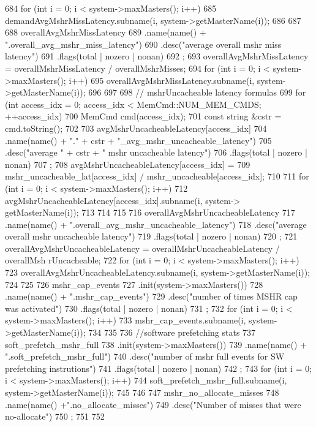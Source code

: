 \begin{DoxyCode}
{684     for (int i = 0; i < system->maxMasters(); i++) {
685         demandAvgMshrMissLatency.subname(i, system->getMasterName(i));
686     }
687 
688     overallAvgMshrMissLatency
689         .name(name() + ".overall_avg_mshr_miss_latency")
690         .desc("average overall mshr miss latency")
691         .flags(total | nozero | nonan)
692         ;
693     overallAvgMshrMissLatency = overallMshrMissLatency / overallMshrMisses;
694     for (int i = 0; i < system->maxMasters(); i++) {
695         overallAvgMshrMissLatency.subname(i, system->getMasterName(i));
696     }
697 
698     // mshrUncacheable latency formulas
699     for (int access_idx = 0; access_idx < MemCmd::NUM_MEM_CMDS; ++access_idx) {
700         MemCmd cmd(access_idx);
701         const string &cstr = cmd.toString();
702 
703         avgMshrUncacheableLatency[access_idx]
704             .name(name() + "." + cstr + "_avg_mshr_uncacheable_latency")
705             .desc("average " + cstr + " mshr uncacheable latency")
706             .flags(total | nozero | nonan)
707             ;
708         avgMshrUncacheableLatency[access_idx] =
709             mshr_uncacheable_lat[access_idx] / mshr_uncacheable[access_idx];
710 
711         for (int i = 0; i < system->maxMasters(); i++) {
712             avgMshrUncacheableLatency[access_idx].subname(i, system->
      getMasterName(i));
713         }
714     }
715 
716     overallAvgMshrUncacheableLatency
717         .name(name() + ".overall_avg_mshr_uncacheable_latency")
718         .desc("average overall mshr uncacheable latency")
719         .flags(total | nozero | nonan)
720         ;
721     overallAvgMshrUncacheableLatency = overallMshrUncacheableLatency / overallMsh
      rUncacheable;
722     for (int i = 0; i < system->maxMasters(); i++) {
723         overallAvgMshrUncacheableLatency.subname(i, system->getMasterName(i));
724     }
725 
726     mshr_cap_events
727         .init(system->maxMasters())
728         .name(name() + ".mshr_cap_events")
729         .desc("number of times MSHR cap was activated")
730         .flags(total | nozero | nonan)
731         ;
732     for (int i = 0; i < system->maxMasters(); i++) {
733         mshr_cap_events.subname(i, system->getMasterName(i));
734     }
735 
736     //software prefetching stats
737     soft_prefetch_mshr_full
738         .init(system->maxMasters())
739         .name(name() + ".soft_prefetch_mshr_full")
740         .desc("number of mshr full events for SW prefetching instrutions")
741         .flags(total | nozero | nonan)
742         ;
743     for (int i = 0; i < system->maxMasters(); i++) {
744         soft_prefetch_mshr_full.subname(i, system->getMasterName(i));
745     }
746 
747     mshr_no_allocate_misses
748         .name(name() +".no_allocate_misses")
749         .desc("Number of misses that were no-allocate")
750         ;
751 
752 }
\end{DoxyCode}
